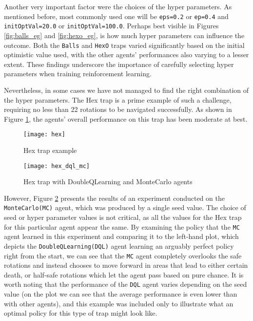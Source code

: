 Another very important factor were the choices of the hyper parameters. As mentioned before, most commonly used one will be \texttt{eps=0.2} or \texttt{ep=0.4} and \texttt{initOptVal=20.0} or \texttt{initOptVal=100.0}. Perhaps best visible in Figures \ref{fig:balls_eg} and \ref{fig:hexo_eg}, is how much hyper parameters can influence the outcome. Both the \texttt{Balls} and \texttt{HexO} traps varied significantly based on the initial optimistic value used, with the other agents' performances also varying to a lesser extent. These findings underscore the importance of carefully selecting hyper parameters when training reinforcement learning.

Nevertheless, in some cases we have not managed to find the right combination of the hyper parameters. The Hex trap is a prime example of such a challenge, requiring no less than 22 rotations to be navigated successfully. As shown in Figure \ref{fig:hex_eg}, the agents' overall performance on this trap has been moderate at best.

\begin{figure}[h]
    \centering
    \texttt{[image: hex]}
    \caption{Hex trap example}
    \label{fig:hex_eg}
\end{figure}

\begin{figure}[h]
    \centering
    \texttt{[image: hex\_dql\_mc]}
    \caption{Hex trap with DoubleQLearning and MonteCarlo agents}
    \label{fig:hex_diff_eg}
\end{figure}

However, Figure \ref{fig:hex_diff_eg} presents the results of an experiment conducted on the \texttt{MonteCarlo(MC)} agent, which was produced by a single seed value. The choice of seed or hyper parameter values is not critical, as all the values for the Hex trap for this particular agent appear the same. By examining the policy that the \texttt{MC} agent learned in this experiment and comparing it to the left-hand plot, which depicts the \texttt{DoubleQLearning(DQL)} agent learning an arguably perfect policy right from the start, we can see that the \texttt{MC} agent completely overlooks the safe rotations and instead chooses to move forward in areas that lead to either certain death, or half-safe rotations which let the agent pass based on pure chance. It is worth noting that the performance of the \texttt{DQL} agent varies depending on the seed value (on the plot we can see that the average performance is even lower than with other agents), and this example was included only to illustrate what an optimal policy for this type of trap might look like.

